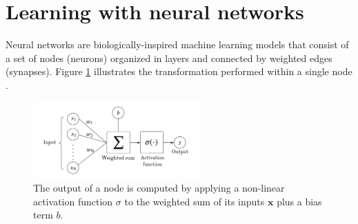 \section{Learning with neural networks}

Neural networks are biologically-inspired machine learning models that consist of a set of 
nodes (neurons) organized in layers and connected by weighted edges
(synapses). Figure \ref{fig:nn_node} illustrates the transformation
performed within a single node
\cite{simonyanVeryDeepConvolutional2015,n.vapnikNatureStatisticalLearning2000,voulodimosDeepLearningComputer2018}. 

\begin{figure}[H]
    \centering
    \includegraphics[width=0.57\textwidth]{img/theoretical_background/nn_unit.pdf}
    \caption{The output of a node is computed by applying a non-linear
    activation function $\sigma$ to the weighted sum of its inputs $\bm{x}$ plus
    a bias term $b$.}
    \label{fig:nn_node}
\end{figure}

